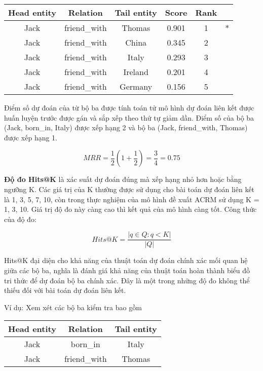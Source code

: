 \begin{table}[H]
\centering
\begin{tabular}{cccccc}
\hline
Head entity &  Relation & Tail entity & Score & Rank & \\
\hline
Jack &  friend\_with &  Thomas  &   0.901  &    1& *\\
Jack &  friend\_with &  China    &  0.345  &    2&\\
Jack &  friend\_with &  Italy    &  0.293  &    3&\\
Jack &  friend\_with &  Ireland  &  0.201  &    4&\\
Jack &  friend\_with &  Germany  &  0.156  &    5&\\
\hline
\end{tabular}
\end{table}

Điểm số dự đoán của từ bộ ba được tính toán tử mô hình dự đoán liên kết được huấn luyện trước được gán và sắp xếp theo thứ tự giảm dần. Điểm số của bộ ba (Jack, born\_in, Italy) được xếp hạng 2 và bộ ba (Jack, friend\_with, Thomas) được xếp hạng 1.

$$
MRR = \frac{1}{2}\left(1+\frac{1}{2}\right) = \frac{3}{4} = 0.75
$$

\textbf{Độ đo Hits@K} là xác suất dự đoán đúng mà xếp hạng nhỏ hơn hoặc bằng ngưỡng K. Các giá trị của K thường được sử dụng cho bài toán dự đoán liên kết là 1, 3, 5, 7, 10, còn trong thực nghiệm của mô hình đề xuất ACRM sử dụng K = 1, 3, 10. Giá trị độ đo này càng cao thì kết quả của mô hình càng tốt. Công thức của độ đo:

\begin{equation}
    \textit{Hits@K} = \frac{|{q\in Q : q < K}|}{|Q|}
    \end{equation}

    Hits@K đại diện cho khả năng của thuật toán dự đoán chính xác mối quan hệ giữa các bộ ba, nghĩa là đánh giá khả năng của thuật toán hoàn thành biểu đồ tri thức để dự đoán bộ ba chính xác. Đây là một trong những độ đo không thể thiếu đối với bài toán dự đoán liên kết.

    Ví dụ: Xem xét các bộ ba kiểm tra bao gồm

    \begin{table}[H]
    \centering
    \begin{tabular}{ccc}
    \hline
    Head entity &  Relation & Tail entity \\
    \hline
    Jack  & born\_in  & Italy \\
    Jack  & friend\_with  & Thomas \\
    \hline
    \end{tabular}
    \end{table}

